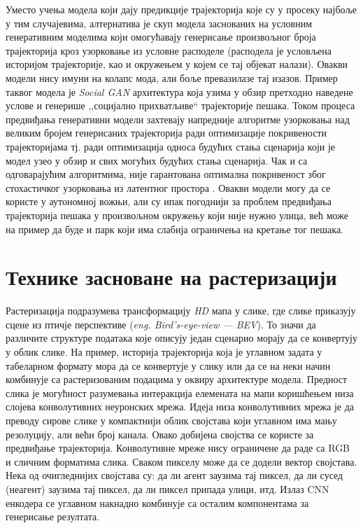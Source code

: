 \documentclass[11pt,oneside]{memoir}
\begin{document}
Уместо учења модела који дају предикције трајекторија које су у просеку најбоље у тим случајевима, 
алтернатива је скуп модела заснованих на условним генеративним моделима који
омогућавају генерисање произвољног броја трајекторија кроз узорковање из условне расподеле 
(расподела је условљена историјом трајекторије, као и окружењем у којем се тај објекат налази). Овакви модели нису имуни на колапс мода,
али боље превазилазе тај изазов.
Пример таквог модела је \textit{Social GAN} \cite{social_gan} архитектура која узима у обзир претходно наведене услове и генерише ,,социјално прихватљиве`` 
трајекторије пешака. Током процеса предвиђања генеративни модели захтевају напредније алгоритме узорковања над великим бројем генерисаних
трајекторија ради оптимизације покривености трајекторијама тј. ради оптимизација 
односа будућих стања сценарија који је модел узео у обзир и свих могућих будућих стања сценарија. Чак и са одговарајућим алгоритмима,
није гарантована оптимална покривеност због стохастичког узорковања из латентног простора \cite{tnt}. Овакви модели могу да се користе
у аутономној вожњи, али су ипак погоднији за
проблем предвиђања трајекторија пешака у произвољном окружењу који није нужно улица, већ може на пример да буде и парк који има слабија ограничења
на кретање тог пешака.

\section{Технике засноване на растеризацији}

Растеризација подразумева трансформацију \textit{HD} мапа у слике, где слике приказују сцене из птичје 
перспективе (\textit{eng. Bird's-eye-view --- BEV}). То значи да различите структуре података које описују један сценарио 
морају да се конвертују у облик слике. На пример, историја трајекторија која је углавном задата у табеларном формату мора да се конвертује 
у слику или да се на неки начин комбинује са растеризованим подацима у оквиру архитектуре модела.
Предност слика је могућност разумевања интеракција елемената на мапи 
коришћењем низа слојева конволутивних неуронских мрежа.
Идеја низа конволутивних мрежа је да преводу сирове слике у компактнији облик својстава који углавном има мању резолуцију, 
али већи број канала. Овако добијена својства се користе за предвиђање трајекторија.
Конволутивне мреже нису ограничене да раде са RGB и сличним форматима слика. Сваком пикселу може да се додели вектор својстава. 
Нека од очигледнијих својстава су: да ли агент заузима тај пиксел, да ли сусед (неагент) заузима тај пиксел,
да ли пиксел припада улици, итд. Излаз CNN енкодера се углавном накнадно комбинује са осталим компонентама за генерисање резултата. 
\end{document}
